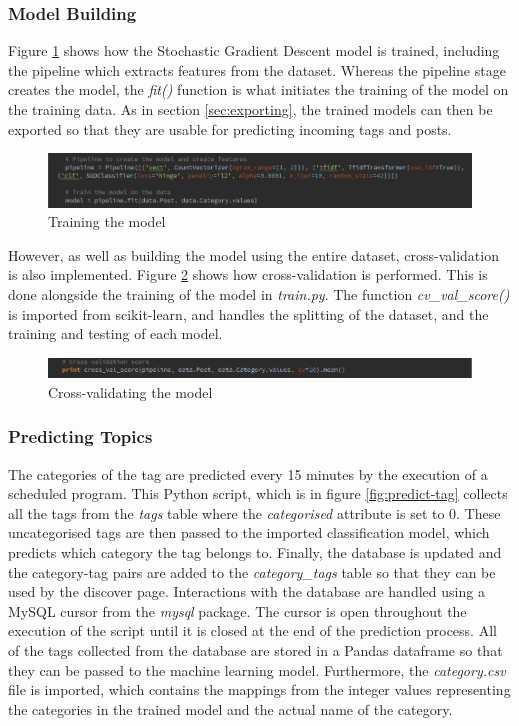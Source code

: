 \subsubsection{Model Building}
Figure \ref{fig:imp-content-train} shows how the Stochastic Gradient Descent model is trained, including the pipeline which extracts features from the dataset. Whereas the pipeline stage creates the model, the \textit{fit()} function is what initiates the training of the model on the training data. As in section \ref{sec:exporting}, the trained models can then be exported so that they are usable for predicting incoming tags and posts.

\begin{figure}[H]
\centering
\includegraphics[width=\textwidth]{Images/Implementation/content-train}
\caption{Training the model}
\label{fig:imp-content-train}
\end{figure}

However, as well as building the model using the entire dataset, cross-validation is also implemented. Figure \ref{fig:content-cv} shows how cross-validation is performed. This is done alongside the training of the model in \emph{train.py}. The function \textit{cv\_val\_score()} is imported from scikit-learn, and handles the splitting of the dataset, and the training and testing of each model.

\begin{figure}[H]
\centering
\includegraphics[width=\textwidth]{Images/Implementation/content-cv}
\caption{Cross-validating the model}
\label{fig:content-cv}
\end{figure}

\subsubsection{Predicting Topics}
The categories of the tag are predicted every 15 minutes by the execution of a scheduled program. This Python script, which is in figure \ref{fig:predict-tag} collects all the tags from the \emph{tags} table where the \emph{categorised} attribute is set to 0. These uncategorised tags are then passed to the imported classification model, which predicts which category the tag belongs to. Finally, the database is updated and the category-tag pairs are added to the \emph{category\_tags} table so that they can be used by the discover page. Interactions with the database are handled using a MySQL cursor from the \emph{mysql} package. The cursor is open throughout the execution of the script until it is closed at the end of the prediction process. All of the tags collected from the database are stored in a Pandas dataframe so that they can be passed to the machine learning model. Furthermore, the \emph{category.csv} file is imported, which contains the mappings from the integer values representing the categories in the trained model and the actual name of the category.

